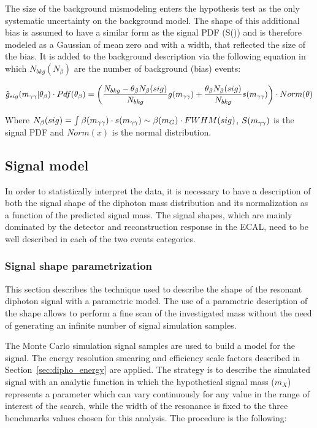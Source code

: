 The size of the background mismodeling enters the hypothesis test as the only
systematic uncertainty on the background model. The shape of this additional bias is
assumed to have a similar form as the signal PDF (S(\mgg)) and is therefore modeled
as a Gaussian of mean zero and with a width, that reflected the size of the bias. It is
added to the background description via the following equation in which $N_{bkg} (N_{\beta})$ are
the number of background (bias) events:

\begin{equation}
    \tilde{g}_{sig}(m_{\gamma\gamma}|\theta_{\beta}) \cdot Pdf(\theta_{\beta}) = \left ( \frac{
          N_{bkg} - \theta_{\beta} N_{\beta}(sig) } {N_{bkg}} g(m_{\gamma\gamma}) + \frac
    {\theta_{\beta} N_{\beta}(sig)} {N_{bkg}} s(m_{\gamma\gamma}) \right ) \cdot Norm(\theta)
\label{eq:bkgspurious}
\end{equation}

Where $N_{\beta}(sig) = \int \beta(m_{\gamma\gamma}) \cdot s(m_{\gamma\gamma}) \sim \beta(m_{G}) \cdot FWHM(sig)$,
$S(m_{\gamma\gamma})$ is the signal PDF and $Norm(x)$ is the normal distribution.

\clearpage
\subsection{Signal model}

In order to statistically interpret the data, it is necessary to have a description of both the signal shape
of the diphoton mass distribution and its normalization as a function of the predicted signal mass.
The signal shapes, which are mainly dominated by the detector and reconstruction response in the ECAL,
need to be well described in each of the two events categories.

\subsubsection{Signal shape parametrization}
\label{sec:signal_shape}
This section describes the technique used to describe the shape of the resonant diphoton signal with a parametric model. 
The use of a parametric description of the shape 
allows to perform a fine scan of the investigated mass without the need of generating an 
infinite number of signal simulation samples.

The Monte Carlo simulation signal samples are used to build a model for the signal.
The energy resolution smearing and efficiency scale factors 
described in Section~\ref{sec:dipho_energy} are applied.
The strategy is to describe the simulated signal with an analytic function in which the hypothetical signal mass ($m_{X}$)
represents a parameter which can vary continuously for any value in the range of interest of the search, while
the width of the resonance is fixed to the three benchmarks values chosen for this analysis.
The procedure is the following:

